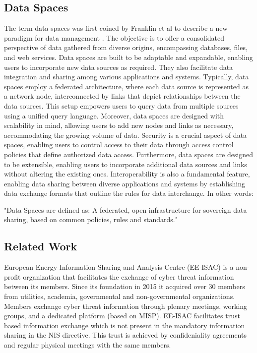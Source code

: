 \documentclass{article}
\begin{document}
\subsection*{Data Spaces}
The term data spaces was first coined by Franklin et al to describe a new paradigm for data management \cite{franklin_databases_2005}. The objective is to offer a consolidated perspective of data gathered from diverse origins, encompassing databases, files, and web services. Data spaces are built to be adaptable and expandable, enabling users to incorporate new data sources as required. They also facilitate data integration and sharing among various applications and systems. Typically, data spaces employ a federated architecture, where each data source is represented as a network node, interconnected by links that depict relationships between the data sources. This setup empowers users to query data from multiple sources using a unified query language. Moreover, data spaces are designed with scalability in mind, allowing users to add new nodes and links as necessary, accommodating the growing volume of data. Security is a crucial aspect of data spaces, enabling users to control access to their data through access control policies that define authorized data access. Furthermore, data spaces are designed to be extensible, enabling users to incorporate additional data sources and links without altering the existing ones. Interoperability is also a fundamental feature, enabling data sharing between diverse applications and systems by establishing data exchange formats that outline the rules for data interchange. In other words:

"Data Spaces are defined as: A federated, open infrastructure for sovereign data sharing, based on common policies, rules and standards." \cite{reiberg2022data}

\subsection*{Related Work}
European Energy Information Sharing and Analysis Centre (EE-ISAC) is a non-profit organization that facilitates the exchange of cyber threat information between its members. Since its foundation in 2015 it acquired over 30 members from utilities, academia, governmental and non-governmental organizations. Members exchange cyber threat information through plenary meetings, working groups, and a dedicated platform (based on MISP). EE-ISAC facilitates trust based information exchange which is not present in the mandatory information sharing in the NIS directive. This trust is achieved by confideniality agreements and regular physical meetings with the same members. \cite{isacpractical_2022}
\end{document}
